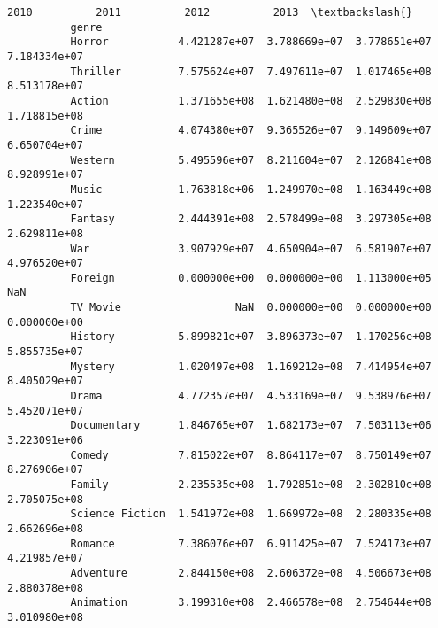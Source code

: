 \documentclass[11pt]{article}
\begin{document}
\begin{Verbatim}[commandchars=\\\{\}]
                                   2010          2011          2012          2013  \textbackslash{}
          genre                                                                     
          Horror           4.421287e+07  3.788669e+07  3.778651e+07  7.184334e+07   
          Thriller         7.575624e+07  7.497611e+07  1.017465e+08  8.513178e+07   
          Action           1.371655e+08  1.621480e+08  2.529830e+08  1.718815e+08   
          Crime            4.074380e+07  9.365526e+07  9.149609e+07  6.650704e+07   
          Western          5.495596e+07  8.211604e+07  2.126841e+08  8.928991e+07   
          Music            1.763818e+06  1.249970e+08  1.163449e+08  1.223540e+07   
          Fantasy          2.444391e+08  2.578499e+08  3.297305e+08  2.629811e+08   
          War              3.907929e+07  4.650904e+07  6.581907e+07  4.976520e+07   
          Foreign          0.000000e+00  0.000000e+00  1.113000e+05           NaN   
          TV Movie                  NaN  0.000000e+00  0.000000e+00  0.000000e+00   
          History          5.899821e+07  3.896373e+07  1.170256e+08  5.855735e+07   
          Mystery          1.020497e+08  1.169212e+08  7.414954e+07  8.405029e+07   
          Drama            4.772357e+07  4.533169e+07  9.538976e+07  5.452071e+07   
          Documentary      1.846765e+07  1.682173e+07  7.503113e+06  3.223091e+06   
          Comedy           7.815022e+07  8.864117e+07  8.750149e+07  8.276906e+07   
          Family           2.235535e+08  1.792851e+08  2.302810e+08  2.705075e+08   
          Science Fiction  1.541972e+08  1.669972e+08  2.280335e+08  2.662696e+08   
          Romance          7.386076e+07  6.911425e+07  7.524173e+07  4.219857e+07   
          Adventure        2.844150e+08  2.606372e+08  4.506673e+08  2.880378e+08   
          Animation        3.199310e+08  2.466578e+08  2.754644e+08  3.010980e+08   
          

\end{Verbatim}
\end{document}
